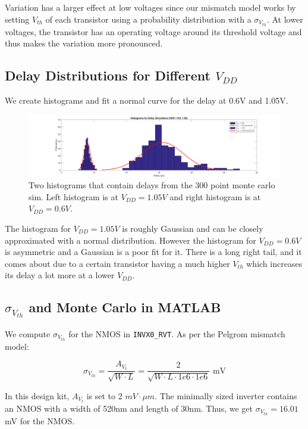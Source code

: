 \documentclass[11pt]{article}
\begin{document}
Variation has a larger effect at low voltages since our mismatch model works by setting $V_{th}$ of each transistor using a probability distribution with a $\sigma_{V_{th}}$. At lower voltages, the transistor has an operating voltage around its threshold voltage and thus makes the variation more pronounced.

\subsection{Delay Distributions for Different $V_{DD}$}
We create histograms and fit a normal curve for the delay at 0.6V and 1.05V. 

\begin{figure}[H]
	\centerline{\includegraphics[width=\textwidth+4cm]{delay_histograms.png}}
	\caption{Two histograms that contain delays from the 300 point monte carlo sim. Left histogram is at $V_{DD} = 1.05V$ and right histogram is at $V_{DD} = 0.6V$.}
\end{figure}

The histogram for $V_{DD} = 1.05V$ is roughly Gaussian and can be closely approximated with a normal distribution. However the histogram for $V_{DD} = 0.6V$ is asymmetric and a Gaussian is a poor fit for it. There is a long right tail, and it comes about due to a certain transistor having a much higher $V_{th}$ which increases its delay a lot more at a lower $V_{DD}$.

\subsection{$\sigma_{V_{th}}$ and Monte Carlo in MATLAB}
We compute $\sigma_{V_{th}}$ for the NMOS in \verb|INVX0_RVT|. As per the Pelgrom mismatch model:

\begin{equation}
	\sigma_{V_{th}} = \frac{A_{V_t}}{\sqrt{W \cdot L}} = \frac{2}{\sqrt{W \cdot L \cdot 1e6 \cdot 1e6}} \text{ mV}
\end{equation}

In this design kit, $A_{V_t}$ is set to 2 $mV \cdot \mu m$. The minimally sized inverter contains an NMOS with a width of 520nm and length of 30nm. Thus, we get $\sigma_{V_{th}} = 16.01$ mV for the NMOS.
\end{document}
